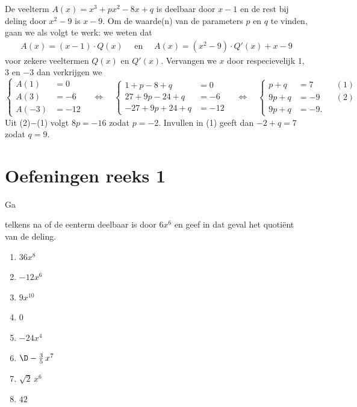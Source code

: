 \documentclass{ximera}
\begin{document}
\begin{example}
De veelterm $A(x) = x^3 + px^2 - 8x + q$ is deelbaar door $x-1$ en de rest bij deling door $x^2 - 9$ is $x-9$. Om de waarde(n) van de parameters $p$ en $q$ te vinden, gaan we als volgt te werk: we weten dat
\begin{align*}
A(x) = (x-1)\cdot Q(x) \quad \text{ en } \quad A(x) = (x^2-9)\cdot Q'(x) + x - 9
\end{align*}
voor zekere veeltermen $Q(x)$ en $Q'(x)$. Vervangen we $x$ door respecievelijk $1$, $3$ en $-3$ dan verkrijgen we 
\[
\left\{
\begin{aligned}
A(1) & = 0 \\
A(3) & = -6 \\
A(-3) & = -12
\end{aligned}
\right.
\quad \Leftrightarrow \quad 
\left\{
\begin{aligned}
1+p-8+q & = 0 \\
27+9p-24+q & = -6 \\
-27+9p+24+q & = -12
\end{aligned}
\right.
\quad \Leftrightarrow \quad 
\left\{
\begin{aligned}
p+q & = 7 && (1) \\
9p+q & = -9 && (2) \\
9p+q & = -9.
\end{aligned}
\right.
\]
Uit (2)$-$(1) volgt $8p=-16$ zodat $p = -2$. Invullen in (1) geeft dan $-2+q=7$ zodat $q = 9$. 
\end{example}


{}
\section*{Oefeningen reeks 1}
\begin{Oefening}\setcounter{enumi}{1} 
\hypertarget{oef2.1}{Ga} telkens na of de eenterm deelbaar is door $6x^6$ en geef in dat geval het quoti\"ent van de deling.
\begin{multicols}{2}
\begin{enumerate}

\item
$36x^8$
\item
$-12x^6$
\item
$9x^{10}$
\item
$0$
\item
$-24x^4$
\item
$\D -\frac{3}{5}\,x^7$ 
\item
$\sqrt{2}\,x^6$ 
\item
$42$
\end{enumerate}
\end{multicols}
\end{Oefening}
\end{document}
